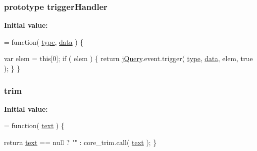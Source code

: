 \subsubsection[{trigger\+Handler}]{ {\bf prototype} trigger\+Handler}\label{jquery-1_810_82-vsdoc_8js_afe18935b86e978c91a4ae291ad8825c8}
{\bfseries Initial value\+:}
\begin{DoxyCode}
= \textcolor{keyword}{function}( \hyperlink{jquery-1_810_82-vsdoc_8js_a3940565e83a9bfd10d95ffd27536da91}{type}, \hyperlink{jquery-1_810_82-vsdoc_8js_a609407b3456fdc3c5671a9fc4a226ff7}{data} ) \{


        var elem = \textcolor{keyword}{this}[0];
        \textcolor{keywordflow}{if} ( elem ) \{
            \textcolor{keywordflow}{return} \hyperlink{jquery-1_810_82-vsdoc_8js_add5237586d970a38a81f990e8eb28c6c}{jQuery}.event.trigger( \hyperlink{jquery-1_810_82-vsdoc_8js_a3940565e83a9bfd10d95ffd27536da91}{type}, \hyperlink{jquery-1_810_82-vsdoc_8js_a609407b3456fdc3c5671a9fc4a226ff7}{data}, elem, \textcolor{keyword}{true} );
        \}
    \}
\end{DoxyCode}
\hypertarget{jquery-1_810_82-vsdoc_8js_a5c6bdf61ecee84c4d51137801d3fac85}{}
\subsubsection[{trim}]{ trim}\label{jquery-1_810_82-vsdoc_8js_a5c6bdf61ecee84c4d51137801d3fac85}
{\bfseries Initial value\+:}
\begin{DoxyCode}
= \textcolor{keyword}{function}( \hyperlink{jquery-1_810_82-vsdoc_8js_aa5b77da29631a344064bb3d20c8702de}{text} ) \{


            \textcolor{keywordflow}{return} \hyperlink{jquery-1_810_82-vsdoc_8js_aa5b77da29631a344064bb3d20c8702de}{text} == null ?
                \textcolor{stringliteral}{""} :
                core\_trim.call( \hyperlink{jquery-1_810_82-vsdoc_8js_aa5b77da29631a344064bb3d20c8702de}{text} );
        \}
\end{DoxyCode}
\hypertarget{jquery-1_810_82-vsdoc_8js_a91e55267cc469e865a6a7c6cfc51c7b1}{}
